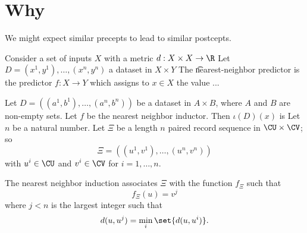 

\section*{Why}

We might expect similar precepts to lead to similar postcepts.

Consider a set of inputs $X$ with a metric $d: X \times X \to \R$
Let $D = (x^1, y^1), \dots , (x^n, y^n)$ a dataset in $X \times  Y$
The \t{nearest-neighbor predictor} is the predictor $f: X \to Y$ which assigns to $x \in X$ the value ...

Let $D = ((a^1, b^1), \dots , (a^n, b^n))$ be a dataset in $A \times  B$, where $A$ and $B$ are non-empty sets.
Let $f$ be the nearest neighbor inductor.
Then $\iota (D)(x)$ is
Let $n$ be a natural number.
Let $\Xi$ be a length $n$ paired record sequence in $\CU \times  \CV$; so
\[
\Xi = ((u^1, v^1), \dots , (u^n, v^n))
\]
with $u^i \in \CU$ and $v^i \in \CV$ for $i = 1,\dots ,n$.

The nearest neighbor induction associates
$\Xi $ with the function $f_{\Xi }$ such that
\[
f_{\Xi }(u) = v^j
\]
where $j < n$ is the largest integer such that
\[
d(u, u^j) = \min_{i} \set{d(u, u^i)}.
\]

\blankpage
